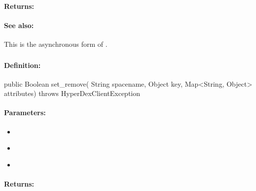 \paragraph{Returns:}


\paragraph{See also:}  This is the asynchronous form of .

\pagebreak
\subsubsection{}
\label{api:java:set_remove}


\paragraph{Definition:}
\begin{javacode}
public Boolean set_remove(
        String spacename,
        Object key,
        Map<String, Object> attributes) throws HyperDexClientException
\end{javacode}

\paragraph{Parameters:}
\begin{itemize}[noitemsep]
\item {}\\

\item {}\\

\item {}\\

\end{itemize}

\paragraph{Returns:}


